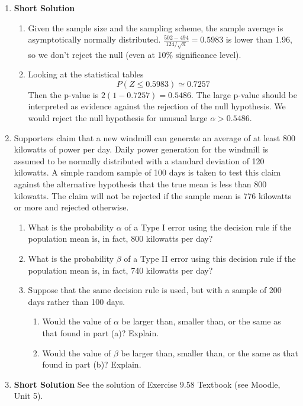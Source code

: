 \documentclass[11pt,a4paper]{article}
\begin{document}
\begin{enumerate}[labelindent=0pt,labelwidth=0.75em,leftmargin=!]
\item[]\textbf{Short Solution}
\begin{enumerate}
\item Given the sample size and the sampling scheme, the sample average is asymptotically normally distributed. 
 $\frac{502-494}{124/\sqrt{n}}=0.5983$ is lower than 1.96, so we don't reject the null (even at 10\% significance level).
\item Looking at the statistical tables
$$
P\left(Z\leq 0.5983\right)\simeq 0.7257
$$
Then the p-value is $2(1-0.7257)=0.5486$. The large p-value should be interpreted as evidence against the rejection of the null hypothesis. We would reject the null hypothesis for unusual large $\alpha>0.5486$.
\end{enumerate}
\item Supporters claim that a new windmill can generate
an average of at least 800 kilowatts of power per day.
Daily power generation for the windmill is assumed
to be normally distributed with a standard deviation of 120 kilowatts. A simple random sample of 100 days is
taken to test this claim against the alternative hypothesis that the true mean is less than 800 kilowatts. The
claim will not be rejected if the sample mean is 776
kilowatts or more and rejected otherwise. 
\begin{enumerate}
\item What is the probability $\alpha$ of a Type I error using
the decision rule if the population mean is, in fact,
800 kilowatts per day?
\item What is the probability $\beta$ of a Type II error using
this decision rule if the population mean is, in fact,
740 kilowatts per day?
\item Suppose that the same decision rule is used, but
with a sample of 200 days rather than 100 days.
\begin{enumerate}
\item Would the value of $\alpha$ be larger than, smaller
than, or the same as that found in part (a)? Explain.
\item Would the value of $\beta$ be larger than, smaller
than, or the same as that found in part (b)? Explain.
\end{enumerate}
\end{enumerate}
%
\item[]\textbf{Short Solution} See the solution of Exercise 9.58 Textbook (see Moodle, Unit 5).

\end{enumerate}
\end{document}
